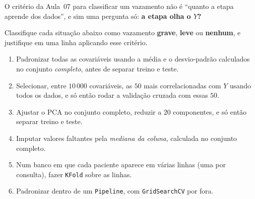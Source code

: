 \documentclass[11pt,a4paper]{article}
\begin{document}

\begin{exercicio}
O critério da Aula~07 para classificar um vazamento não é ``quanto a etapa
aprende dos dados'', e sim uma pergunta só: \textbf{a etapa olha o $Y$?}

Classifique cada situação abaixo como vazamento \textbf{grave}, \textbf{leve} ou
\textbf{nenhum}, e justifique em uma linha aplicando esse critério.
\begin{enumerate}[label=(\alph*),leftmargin=1.1cm]
  \item Padronizar todas as covariáveis usando a média e o desvio-padrão
        calculados no conjunto \emph{completo}, antes de separar treino e teste.
  \item Selecionar, entre $10\,000$ covariáveis, as $50$ mais correlacionadas com
        $Y$ usando todos os dados, e só então rodar a validação cruzada com essas
        $50$.
  \item Ajustar o PCA no conjunto completo, reduzir a $20$ componentes, e só
        então separar treino e teste.
  \item Imputar valores faltantes pela \emph{mediana da coluna}, calculada no
        conjunto completo.
  \item Num banco em que cada paciente aparece em várias linhas (uma por
        consulta), fazer \texttt{KFold} sobre as linhas.
  \item Padronizar dentro de um \texttt{Pipeline}, com \texttt{GridSearchCV} por
        fora.
\end{enumerate}
\end{exercicio}
\end{document}
